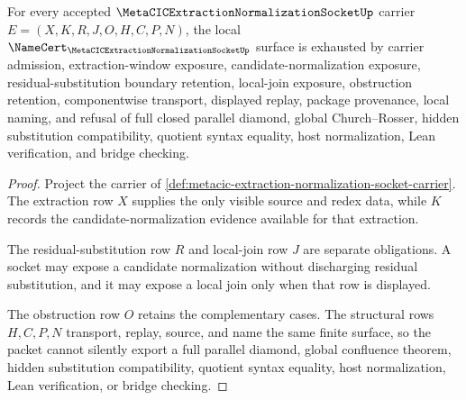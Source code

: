 \begin{theorem}
\label{thm:metacic-extraction-normalization-socket-namecert-obligations}
For every accepted $\MetaCICExtractionNormalizationSocketUp$ carrier $E=(X,K,R,J,O,H,C,P,N)$, the local $\NameCert_{\MetaCICExtractionNormalizationSocketUp}$ surface is exhausted by carrier admission, extraction-window exposure, candidate-normalization exposure, residual-substitution boundary retention, local-join exposure, obstruction retention, componentwise transport, displayed replay, package provenance, local naming, and refusal of full closed parallel diamond, global Church--Rosser, hidden substitution compatibility, quotient syntax equality, host normalization, Lean verification, and bridge checking.
\end{theorem}
\begin{proof}
Project the carrier of \autoref{def:metacic-extraction-normalization-socket-carrier}. The extraction row $X$ supplies the only visible source and redex data, while $K$ records the candidate-normalization evidence available for that extraction.

The residual-substitution row $R$ and local-join row $J$ are separate obligations. A socket may expose a candidate normalization without discharging residual substitution, and it may expose a local join only when that row is displayed.

The obstruction row $O$ retains the complementary cases. The structural rows $H,C,P,N$ transport, replay, source, and name the same finite surface, so the packet cannot silently export a full parallel diamond, global confluence theorem, hidden substitution compatibility, quotient syntax equality, host normalization, Lean verification, or bridge checking.
\end{proof}

